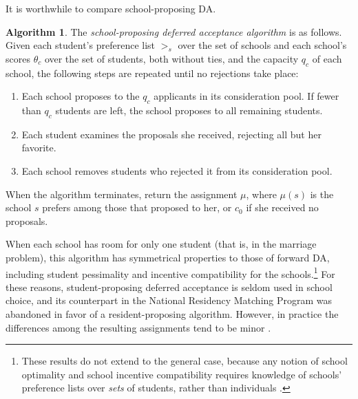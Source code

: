 \documentclass[12pt]{article}
\numberwithin{equation}{subsection}
\theoremstyle{definition}
\newtheorem{algorithm}{Algorithm}
\begin{document}
It is worthwhile to compare school-proposing DA. 
\begin{algorithm}
The \emph{school-proposing deferred acceptance algorithm} is as follows. Given each student's preference list $>_s$ over the set of schools and each school's scores $\theta_c$ over the set of students, both without ties, and the capacity $q_c$ of each school, the following steps are repeated until no rejections take place:
\begin{enumerate}
\item Each school proposes to the $q_c$ applicants in its consideration pool. If fewer than $q_c$ students are left, the school proposes to all remaining students.
\item Each student examines the proposals she received, rejecting all but her favorite.
\item Each school removes students who rejected it from its consideration pool.
\end{enumerate}
When the algorithm terminates, return the assignment $\mu$, where $\mu(s)$ is the school $s$ prefers among those that proposed to her, or $c_0$ if she received no proposals.
\end{algorithm}
When each school has room for only one student (that is, in the marriage problem), this algorithm has symmetrical properties to those of forward DA, including student pessimality and incentive compatibility for the schools.\footnote{These results do not extend to the general case, because any notion of school optimality and school incentive compatibility requires knowledge of schools' preference lists over \emph{sets} of students, rather than individuals \parencite[][]{collegeadmissionsisnotmarriage}.} For these reasons, student-proposing deferred acceptance is seldom used in school choice, and its counterpart in the National Residency Matching Program was abandoned in favor of a resident-proposing algorithm. However, in practice the differences among the resulting assignments tend to be minor \parencite[][]{unbalancedrandommatchingmarkets}. 

\end{document}
